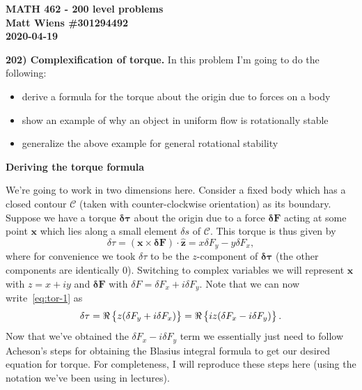 \documentclass{article}
\def\*#1{\mathbf{#1}}
\newcommand{\fC}{\mathcal{C}} %
\newcommand{\zhat}{\mathbf{\hat{z}}}
\newcommand{\dtauvec}{\boldsymbol{\delta \tau}}
\newcommand{\dFvec}{\boldsymbol{\delta} \mathbf{F}}
\newcommand{\dF}{\delta F}
\newcommand{\ds}{\delta s}
\newcommand{\dtau}{\delta \tau}
\begin{document}
\textbf{MATH 462 - 200 level problems} \\
\textbf{Matt Wiens \#301294492} \\
\textbf{2020-04-19}

\textbf{202) Complexification of torque.}
In this problem I'm going to do the following:
%
\begin{itemize}
    \item derive a formula for the torque about the origin due to forces on a body
    \item show an example of why an object in uniform flow is rotationally stable
    \item generalize the above example for general rotational stability
\end{itemize}

\textbf{Deriving the torque formula}

We're going to work in two dimensions here. Consider a fixed body which
has a closed contour $\fC$ (taken with counter-clockwise orientation) as
its boundary. Suppose we have a torque $\dtauvec$ about the origin due
to a force $\dFvec$ acting at some point $\*x$ which lies along a small
element $\ds$ of $\fC$. This torque is thus given by
%
\begin{equation}
    \dtau = (\*x \times \dFvec) \cdot \zhat = x \dF_y - y \dF_x
    \label{eq:tor-1}
    ,
\end{equation}
%
where for convenience we took $\dtau$ to be the $z$-component of
$\dtauvec$ (the other components are identically 0). Switching to complex
variables we will represent $\*x$ with $z = x + i y$ and $\dFvec$ with $\dF =
\dF_x + i \dF_y$. Note that we can now write~\eqref{eq:tor-1} as
%
\begin{equation}
    \dtau = \Re \cbr{z (\dF_y + i \dF_x)} = \Re \cbr{i z (\dF_x - i \dF_y)}
    \label{eq:tor-2}
    .
\end{equation}
%
Now that we've obtained the $\dF_x - i \dF_y$ term we essentially just
need to follow Acheson's steps for obtaining the Blasius integral
formula to get our desired equation for torque. For completeness, I will
reproduce these steps here (using the notation we've been using in
lectures).
\end{document}
